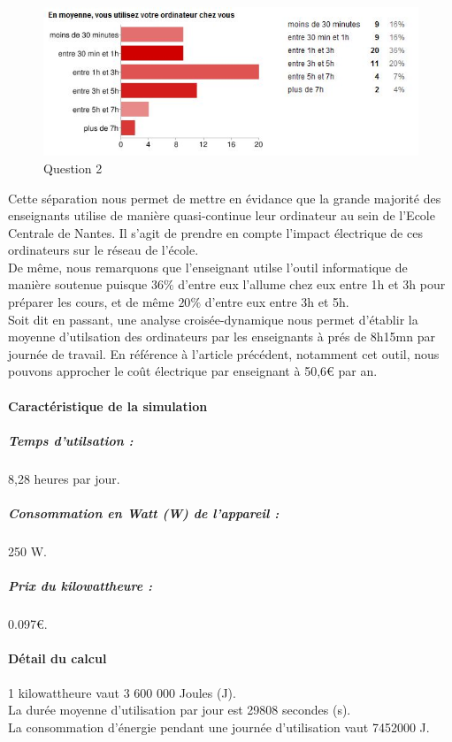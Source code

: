 \documentclass[a4paper,11pt,french]{article}
\begin{document}
\begin{figure}[h!]
\includegraphics[width=\textwidth]{i7.JPG}
\caption{Question 2}
\label{i7}
\end{figure}

Cette séparation nous permet de mettre en évidance que la grande majorité des enseignants utilise de manière quasi-continue leur ordinateur au sein de l'Ecole Centrale de Nantes. Il s'agit de prendre en compte l'impact électrique de ces ordinateurs sur le réseau de l'école.\\

De même, nous remarquons que l'enseignant utilse l'outil informatique de manière soutenue puisque $36\%$ d'entre eux l'allume chez eux entre 1h et 3h pour préparer les cours, et de même $20\%$ d'entre eux entre 3h et 5h.\\

Soit dit en passant, une analyse croisée-dynamique nous permet d'établir la moyenne d'utilsation des ordinateurs par les enseignants à prés de 8h15mn par journée de travail. En référence à l'article précédent, notamment cet outil, nous pouvons approcher le coût électrique par enseignant à 50,6\euro{} par an.\\

\paragraph{Caractéristique de la simulation}

\subparagraph{Temps d'utilsation :} 8,28 heures par jour.
\subparagraph{Consommation en Watt (W) de l'appareil :}250 W.
\subparagraph{Prix du kilowattheure :} 0.097\euro{}. 

\paragraph{Détail du calcul}

1 kilowattheure vaut 3 600 000 Joules (J).\\
La durée moyenne d'utilisation par jour est 29808 secondes (s).\\
La consommation d'énergie pendant une journée d'utilisation vaut 7452000 J.\\
\end{document}

